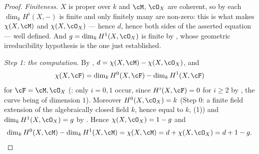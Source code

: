 \begin{proof}
\emph{Finiteness.}  $X$ is proper over $k$ and $\cM$, $\cO_X$ are
coherent, so by  each
$\dim_kH^i(X,-)$ is finite and only finitely many are non-zero: this is
what makes $\chi(X,\cM)$ and $\chi(X,\cO_X)$ --- hence $d$, hence both
sides of the asserted equation --- well defined.  And
$g=\dim_kH^1(X,\cO_X)$ is finite by
, whose geometric irreducibility
hypothesis is the one just established.

\emph{Step 1: the computation.}
By ,
$d=\chi(X,\cM)-\chi(X,\cO_X)$, and
\[
\chi(X,\cF)=\dim_kH^0(X,\cF)-\dim_kH^1(X,\cF)
\]
for $\cF=\cM,\cO_X$ (: only
$i=0,1$ occur, since $H^i(X,\cF)=0$ for $i\ge2$ by
, the curve being of dimension $1$).
Moreover $H^0(X,\cO_X)=k$ (Step 0: a finite field extension of the
algebraically closed field $k$, hence equal to $k$,
(1)) and
$\dim_kH^1(X,\cO_X)=g$ by .  Hence
$\chi(X,\cO_X)=1-g$ and
\[
\dim_kH^0(X,\cM)-\dim_kH^1(X,\cM)
=\chi(X,\cM)=d+\chi(X,\cO_X)=d+1-g.
\]
\end{proof}

